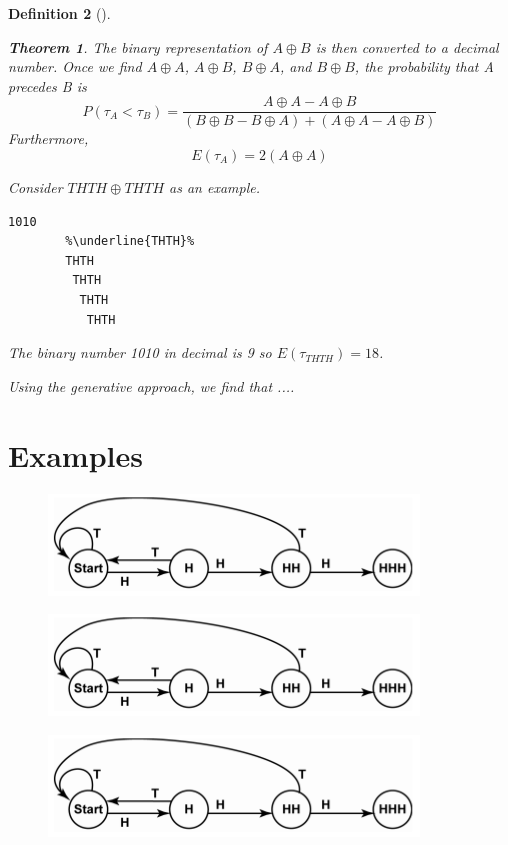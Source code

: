 \documentclass{article}
\newtheorem{theorem}{Theorem}[section]
\newtheorem{definition}[theorem]{Definition}
\numberwithin{mytheorem}{subsection} %
\begin{document}
\begin{definition}[\cite{}]
\begin{theorem}
		The binary representation of $A \oplus B$
		is then converted to a decimal number. Once we find $A \oplus A$, $A \oplus B$,
		$B \oplus A$, and $B \oplus B$, the probability that A precedes B is
		$$P(\tau_A < \tau_B) = \frac{A \oplus A - A \oplus B}{(B \oplus B - B \oplus A) + (A \oplus A - A \oplus B)} $$
		Furthermore, 
		$$E(\tau_A) = 2 (A\oplus A) $$ 

		Consider $THTH \oplus THTH$ as an example.  
		\begin{lstlisting}[escapechar=\%]
		1010 
		%\underline{THTH}%
		THTH
		 THTH
		  THTH 
		   THTH 
		\end{lstlisting}

		The binary number 1010 in decimal is 9 so $E(\tau_{THTH}) = 18$.

		\end{theorem}

		Using the generative approach, we find that ....


	\section{Examples}
		\begin{figure}
		\centering
		\begin{minipage}{.3\textwidth}
		  \centering
		  \includegraphics[width=1.0\linewidth]{StateDiagramforHHH}
		  \label{fig:test1}
		\end{minipage}%
		\begin{minipage}{.3\textwidth}
		  \centering
		  \includegraphics[width=1.0\linewidth]{StateDiagramforHHH}
		  \label{fig:test2}
		\end{minipage}
		\begin{minipage}{.3\textwidth}
		  \centering
		  \includegraphics[width=1.0\linewidth]{StateDiagramforHHH}
		  \label{fig:test2}
		\end{minipage}
		\end{figure}


\end{definition}
\end{document}
